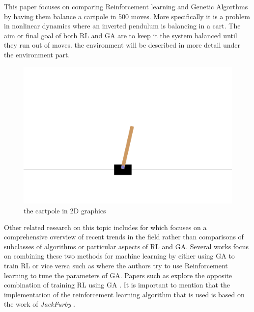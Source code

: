 This paper focuses on comparing Reinforcement learning and Genetic Algorthms by having them balance a cartpole in 500 moves. More specifically it is a problem in nonlinear dynamics where an inverted pendulum is balancing in a cart. The aim or final goal of both RL and GA are to keep it the system balanced until they run out of moves. the environment will be described in more detail under the environment part.  
\begin{figure}[H]
    \centering
    \includegraphics [scale = 0.18]{Images/cartpole.png}
    \caption{the cartpole in 2D graphics}
    \label{figRL}
\end{figure}
Other related research on this topic includes for \cite{drugan2019reinforcement} which focuses on a comprehensive overview of recent trends in the field rather than comparisons of subclasses of algorithms or particular aspects of RL and GA. Several works focus on combining these two methods for machine learning by either using GA to train RL or vice versa such as \cite{eiben2007reinforcement} where the authors try to use Reinforcement learning to tune the parameters of GA.  Papers such as  \cite{khadka2018evolutionary} explore the opposite combination of training RL using GA . It is important to mention that the implementation of the reinforcement learning algorithm that is used is based on the work of \textit{JackFurby} \cite{JackFurbyCartPole}. 



